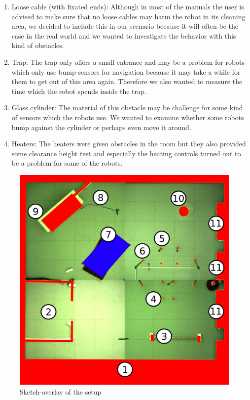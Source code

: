 \documentclass[twoside]{article}
\begin{document}
\begin{enumerate}
\item Loose cable (with fixated ends): Although in most of the manuals the user is advised to make sure that no loose cables may harm the robot in its cleaning area, we decided to include this in our scenario because it will often be the case in the real world and we wanted to investigate the behavior with this kind of obstacles.
\item Trap: The trap only offers a small entrance and may be a problem for robots which only use bump-sensors for navigation because it may take a while for them to get out of this area again. Therefore we also wanted to measure the time which the robot spends inside the trap.
\item Glass cylinder: The material of this obstacle may be challenge for some kind of sensors which the robots use. We wanted to examine whether some robots bump against the cylinder or perhaps even move it around.
\item Heaters: The heaters were given obstacles in the room but they also provided some clearance height test and especially the heating controls turned out to be a problem for some of the robots.
\end{enumerate}
\begin{figure}[H]
	\centering
	\includegraphics[scale=0.15]{pictures/senario_with_walls_picBack_labels.png}
	\caption{Sketch-overlay of the setup}
	\label{fig:scenario}
\end{figure}
\end{document}
